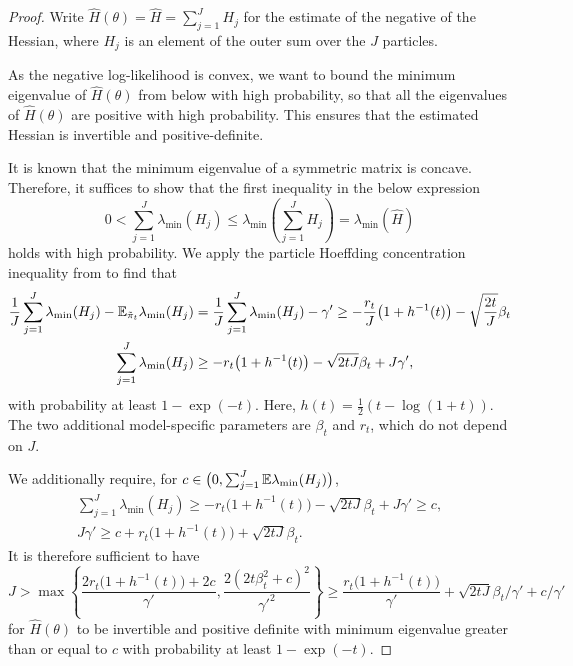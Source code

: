 \begin{proof}
Write $\hat{H}(\theta) = \hat{H} = \sum_{j=1}^J H_j$ for the estimate of the negative of the Hessian, where $H_j$ is an element of the outer sum over the $J$ particles.

As the negative log-likelihood is convex, we want to bound the minimum eigenvalue of $\hat{H}(\theta)$ from below with high probability, so that all the eigenvalues of $\hat{H}(\theta)$ are positive with high probability. This ensures that the estimated Hessian is invertible and positive-definite.

It is known that the minimum eigenvalue of a symmetric matrix is concave. Therefore, it suffices to show that the first inequality in the below expression
\begin{equation}
    0 < \sum_{j=1}^J \lambda_{\min} (H_j) \leq  \lambda_{\min}\left(\sum_{j=1}^J H_j\right) = \lambda_{\min} (\hat{H})
\end{equation}
holds with high probability.
We apply the particle Hoeffding concentration inequality from \cite{delMoral11} to find that  
\begin{align}
    \frac{1}{J}\sum_{j=1}^J \lambda_{\min}(H_j) - \mathbb{E}_{\tilde{\pi}_t}\lambda_{\min}(H_j) &= \frac{1}{J}\sum_{j=1}^J \lambda_{\min}(H_j) - \gamma' \geq -\frac{r_t}{J}\big(1+h^{-1}(t)\big) - \sqrt{\frac{2t}{J}}\beta_t \\
    \sum_{j=1}^J \lambda_{\min}(H_j) &\geq -r_t\big(1+h^{-1}(t)\big) - \sqrt{2tJ}\beta_t + J\gamma',
\end{align}
with probability at least $1-\exp(-t)$. Here, $h(t) = \frac{1}{2}(t - \log(1+t))$. 
The two additional model-specific parameters are $\beta_t$ and $r_t$, which do not depend on $J$. 

We additionally require, for $c \in \big(0, \sum_{j=1}^J \mathbb{E}\lambda_{\min}(H_j)\big)$,
\begin{align}
    \sum_{j=1}^J \lambda_{\min}(H_j) \geq -r_t\big(1+h^{-1}(t)\big) - \sqrt{2tJ}\beta_t + J\gamma' \geq c, \\
    J\gamma' \geq c + r_t\big(1+h^{-1}(t)\big) + \sqrt{2tJ}\beta_t.
\end{align}
It is therefore sufficient to have
\begin{equation}
J > \max\left\{\frac{2r_t\big(1+h^{-1}(t)\big) + 2c}{\gamma'}, \frac{2(2t\beta_t^2+c)^2}{\gamma'^2}\right\} \geq  \frac{r_t\big(1+h^{-1}(t)\big)}{\gamma'} + \sqrt{2tJ}\beta_t/\gamma' + c/\gamma'    
\end{equation}
for $\hat{H}(\theta)$ to be invertible and positive definite with minimum eigenvalue greater than or equal to $c$ with probability at least $1-\exp(-t)$.

\end{proof}


